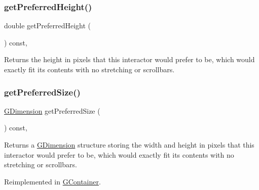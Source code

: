 \subsubsection{\texorpdfstring{get\+Preferred\+Height()}{getPreferredHeight()}}
{\footnotesize\ttfamily double get\+Preferred\+Height (\begin{DoxyParamCaption}{ }\end{DoxyParamCaption}) const\hspace{0.3cm}{\ttfamily [virtual]}, {\ttfamily [inherited]}}



Returns the height in pixels that this interactor would prefer to be, which would exactly fit its contents with no stretching or scrollbars. 

\mbox{\label{classsgl_1_1GInteractor_a4aabbee761d8e9116275401131b7ccd1}} 
\subsubsection{\texorpdfstring{get\+Preferred\+Size()}{getPreferredSize()}}
{\footnotesize\ttfamily \mbox{\hyperlink{structsgl_1_1GDimension}{G\+Dimension}} get\+Preferred\+Size (\begin{DoxyParamCaption}{ }\end{DoxyParamCaption}) const\hspace{0.3cm}{\ttfamily [virtual]}, {\ttfamily [inherited]}}



Returns a \mbox{\hyperlink{structsgl_1_1GDimension}{G\+Dimension}} structure storing the width and height in pixels that this interactor would prefer to be, which would exactly fit its contents with no stretching or scrollbars. 



Reimplemented in \mbox{\hyperlink{classsgl_1_1GContainer_ac0fd6fc35681f935c67ad68078b354b8}{G\+Container}}.

\mbox{\label{classsgl_1_1GInteractor_a82bca31d37700fb0e35d2743352efd5e}} 
